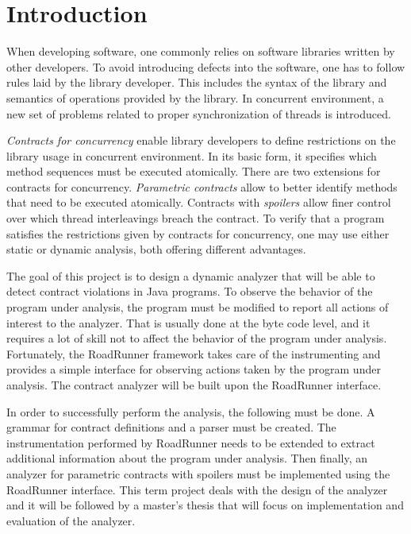 
\chapter{Introduction}

When developing software, one commonly relies on software libraries written by
other developers. To avoid introducing defects into the software, one has to
follow rules laid by the library developer. This includes the syntax of the
library and semantics of operations provided by the library. In concurrent
environment, a new set of problems related to proper synchronization of threads
is introduced.

\emph{Contracts for concurrency} enable library developers to define
restrictions on the library usage in concurrent environment. In its basic form,
it specifies which method sequences must be executed atomically. There are two
extensions for contracts for concurrency. \emph{Parametric contracts} allow to
better identify methods that need to be executed atomically. Contracts with
\emph{spoilers} allow finer control over which thread interleavings breach the
contract. To verify that a program satisfies the restrictions given by contracts
for concurrency, one may use either static or dynamic analysis, both offering
different advantages.

The goal of this project is to design a dynamic analyzer that will be able to
detect contract violations in Java programs. To observe the behavior of the
program under analysis, the program must be modified to report all actions of
interest to the analyzer. That is usually done at the byte code level, and it
requires a lot of skill not to affect the behavior of the program under
analysis. Fortunately, the RoadRunner framework takes care of the instrumenting
and provides a simple interface for observing actions taken by the program under
analysis. The contract analyzer will be built upon the RoadRunner interface.

In order to successfully perform the analysis, the following must be done. A
grammar for contract definitions and a parser must be created. The
instrumentation performed by RoadRunner needs to be extended to extract
additional information about the program under analysis. Then finally, an
analyzer for parametric contracts with spoilers must be implemented using the
RoadRunner interface. This term project deals with the design of the analyzer
and it will be followed by a master's thesis that will focus on implementation
and evaluation of the analyzer.


